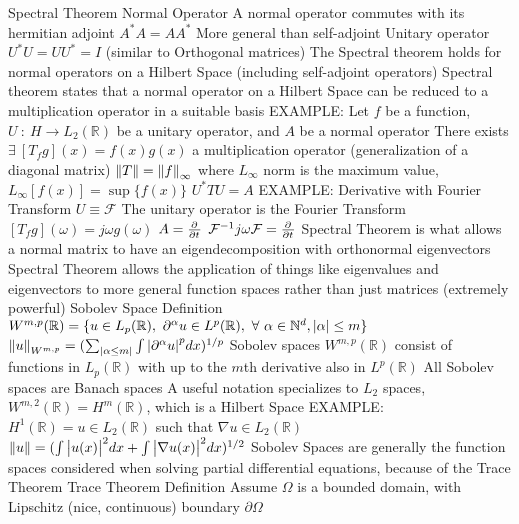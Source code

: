 \documentclass[14pt]{extarticle}
\begin{document}
\begin{outline}
				\2	Spectral Theorem
					\3	Normal Operator
						\4	A normal operator commutes with its hermitian adjoint
								$A^*A = AA^*$
						\4	More general than self-adjoint
						\4	Unitary operator $U^*U = UU^* = I$ (similar to Orthogonal matrices)
					\3	The Spectral theorem holds for normal operators on a Hilbert Space
							(including self-adjoint operators)
					\3	Spectral theorem states that a normal operator on a Hilbert Space
							can be reduced to a multiplication operator in a suitable basis
					\3	EXAMPLE:
						\4	Let $f$ be a function, $U~:~H \rightarrow L_2(\mathbb{R})$ be a unitary operator,
								and $A$ be a normal operator
						\4	There exists $\exists~[T_fg](x) = f(x)g(x)$ a multiplication operator 
								(generalization of a diagonal matrix)
						\4	$\norm{T} = \norm{f}_{\infty}$ where $L_{\infty}$ norm is the
								maximum value, $L_{\infty}[f(x)] = \sup\{f(x)\}$
						\4	$U^* T U = A$
					\3	EXAMPLE:
						\4	Derivative with Fourier Transform
						\4	$U \equiv \mathcal{F}$ The unitary operator is the Fourier Transform
						\4	$[T_fg](\omega) = j\omega g(\omega)$
						\4	$A = \pd{}{t}$
						\4	$\mathcal{F}^{-1} j \omega \mathcal{F} = \pd{}{t}$
					\3	Spectral Theorem is what allows a normal matrix to have an
							eigendecomposition with orthonormal eigenvectors
					\3	Spectral Theorem allows the application of things like eigenvalues
							and eigenvectors to more general function spaces rather than
							just matrices (extremely powerful)
			\1	Sobolev Space
					\2	Definition
						\3	$W^{m,p}(\mathbb{R}) = \{u \in L_p(\mathbb{R}),~
								 \partial^{\alpha} u \in L^p(\mathbb{R}),~\forall~\alpha \in \mathbb{N}^d,
									\abs{\alpha} \le m\}$
						\3	$\norm{u}_{W^{m,p}} = ( \sum_{\abs{\alpha \le m}} \int \abs{\partial^{\alpha}u}^pdx)^{1/p}$
						\3	Sobolev spaces $W^{m,p}(\mathbb{R})$ consist of 
								functions in $L_p(\mathbb{R})$ with up to the $m$th derivative
								also in $L^p(\mathbb{R})$
						\3	All Sobolev spaces are Banach spaces
						\3	A useful notation specializes to $L_2$ spaces, 
								$W^{m,2}(\mathbb{R}) = H^m(\mathbb{R})$, which is a Hilbert Space
					\2	EXAMPLE:
						\3	$H^1(\mathbb{R}) = u \in L_2(\mathbb{R})$ such that
									$\nabla u \in L_2(\mathbb{R})$
						\3	$\norm{u} = (\int \abs{u(x)}^2 dx + \int \abs{\nabla u(x)}^2 dx)^{1/2}$
					\2	Sobolev Spaces are generally the function spaces considered when
							solving partial differential equations, because of the Trace Theorem
					\2	Trace Theorem
						\3	Definition
							\4	Assume $\Omega$ is a bounded domain, with Lipschitz (nice, continuous) boundary $\partial \Omega$

\end{outline}
\end{document}
